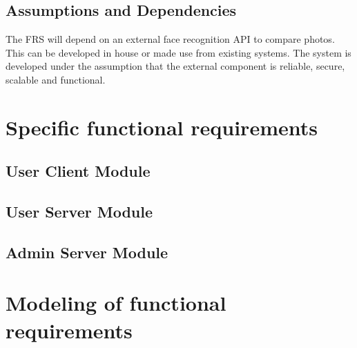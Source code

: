 \documentclass[a4paper,11pt]{article}
\begin{document}
\subsection{Assumptions and Dependencies}
The FRS will depend on an external face recognition API to compare photos. This can be developed in house or made use from existing systems. The system is developed under the assumption that the external component is reliable, secure, scalable and functional. 

\section{Specific functional requirements}

\subsection{User Client Module}

\subsection{User Server Module}

\subsection{Admin Server Module}

\newpage
\section{Modeling of functional requirements}
\end{document}
